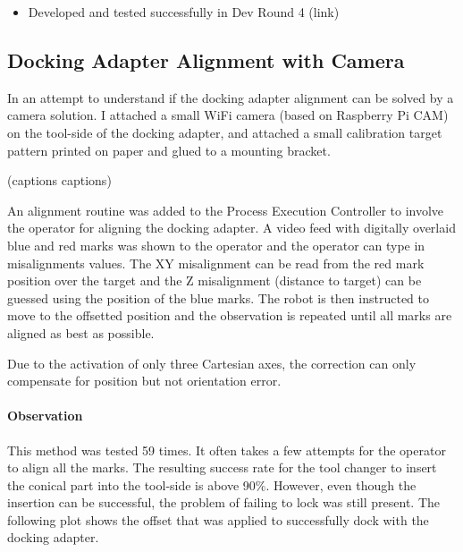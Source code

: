 {\begin{itemize}
\begin{itemize}
	\item Developed and tested successfully in Dev Round 4 (link)

\end{itemize}
\end{itemize}

\subsection{Docking Adapter Alignment with Camera}

In an attempt to understand if the docking adapter alignment can be solved by a camera solution. I attached a small WiFi camera (based on Raspberry Pi CAM) on the tool-side of the docking adapter, and attached a small calibration target pattern printed on paper and glued to a mounting bracket.







(captions captions)

An alignment routine was added to the Process Execution Controller to involve the operator for aligning the docking adapter. A video feed with digitally overlaid blue and red marks was shown to the operator and the operator can type in misalignments values. The XY misalignment can be read from the red mark position over the target and the Z misalignment (distance to target) can be guessed using the position of the blue marks. The robot is then instructed to move to the offsetted position and the observation is repeated until all marks are aligned as best as possible. 

Due to the activation of only three Cartesian axes, the correction can only compensate for position but not orientation error. 

\paragraph{Observation}

This method was tested 59 times.  It often takes a few attempts for the operator to align all the marks. The resulting success rate for the tool changer to insert the conical part into the tool-side is above 90$\%$. However, even though the insertion can be successful, the problem of failing to lock was still present. The following plot shows the offset that was applied to successfully dock with the docking adapter.

}
